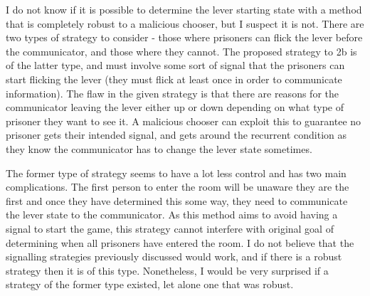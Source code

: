 I do not know if it is possible to determine the lever starting state with a method that is completely robust to a malicious chooser, but I suspect it is not. There are two types of strategy to consider - those where prisoners can flick the lever before the communicator, and those where they cannot. The proposed strategy to 2b is of the latter type, and must involve some sort of signal that the prisoners can start flicking the lever (they must flick at least once in order to communicate information). The flaw in the given strategy is that there are reasons for the communicator leaving the lever either up or down depending on what type of prisoner they want to see it. A malicious chooser can exploit this to guarantee no prisoner gets their intended signal, and gets around the recurrent condition as they know the communicator has to change the lever state sometimes.

The former type of strategy seems to have a lot less control and has two main complications. The first person to enter the room will be unaware they are the first and once they have determined this some way, they need to communicate the lever state to the communicator. As this method aims to avoid having a signal to start the game, this strategy cannot interfere with original goal of determining when all prisoners have entered the room. I do not believe that the signalling strategies previously discussed would work, and if there is a robust strategy then it is of this type. Nonetheless, I would be very surprised if a strategy of the former type existed, let alone one that was robust. 